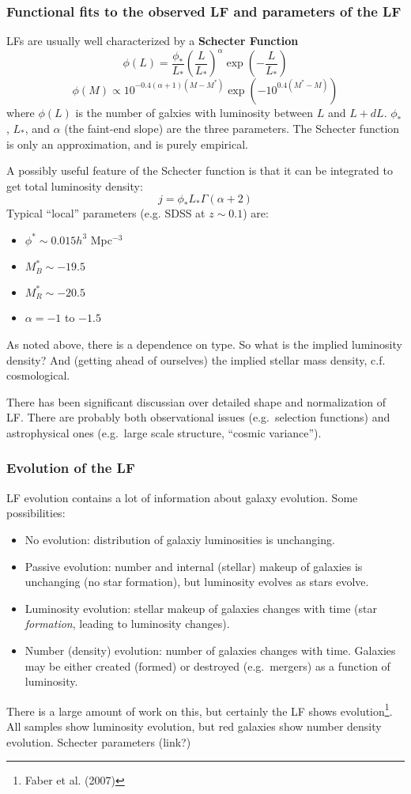 \documentclass{article}
\newcommand{\mynotes}[1]{\textcolor{cadmiumorange}{#1}}
\begin{document}
\subsubsection{Functional fits to the observed LF and parameters of the LF}
LFs are usually well characterized by a \textbf{Schecter Function}
\[
    \phi(L) = \frac{\phi_{*}}{L_{*}}\left(\frac{L}{L_{*}}\right)^{\alpha}
    \exp\left(-\frac{L}{L_{*}}\right)
\]
\[
    \phi(M) \propto 10^{-0.4\left(\alpha+1\right)\left(M-M^*\right)}
    \exp\left(-10^{0.4(M^{*}-M)}\right)
\]
where $\phi(L)$ is the number of galxies with luminosity between
$L$ and $L + dL$.  $\phi_{*}$, $L_{*}$, and $\alpha$ (the faint-end slope)
are the three parameters. The Schecter function is only an approximation, and
is purely empirical.

A possibly useful feature of the Schecter function is that it can be
integrated to get total luminosity density:
\[
    j = \phi_{*}L_{*}\Gamma\left(\alpha + 2\right)
\]
Typical ``local'' parameters (e.g. SDSS at $z\sim0.1$) are:
\begin{itemize}
    \item $\phi^{*}\sim0.015h^{3}$ Mpc$^{-3}$
    \item $M_{B}^{*}\sim-19.5$
    \item $M_{R}^{*}\sim-20.5$
    \item $\alpha=-1$ to $-1.5$
\end{itemize}
As noted above, there is a dependence on type. So what is the implied
luminosity density? And (getting ahead of ourselves) the implied stellar
mass density, c.f. cosmological.

There has been significant discussian over detailed shape and normalization of
LF\@.  There are probably both observational issues (e.g.\ selection functions)
and astrophysical ones (e.g.\ large scale structure, ``cosmic variance'').

\subsubsection{Evolution of the LF}
LF evolution contains a lot of information about galaxy evolution.
Some possibilities:
\begin{itemize}
    \item No evolution: distribution of galaxiy luminosities is unchanging.
    \item Passive evolution: number and internal (stellar) makeup of
        galaxies is unchanging \mynotes{(no star formation)},
        but luminosity evolves as stars evolve.
    \item Luminosity evolution: stellar makeup of galaxies changes with
        time (star \emph{formation}, leading to luminosity changes).
    \item Number (density) evolution: number of galaxies changes with time.
        Galaxies may be either created (formed) or destroyed (e.g.\
        mergers) as a function of luminosity.
\end{itemize}
There is a large amount of work on this, but certainly the LF shows
evolution\footnote{Faber et al. (2007)}. All samples show luminosity
evolution, but red galaxies show number density evolution.
Schecter parameters (link?)
\end{document}
